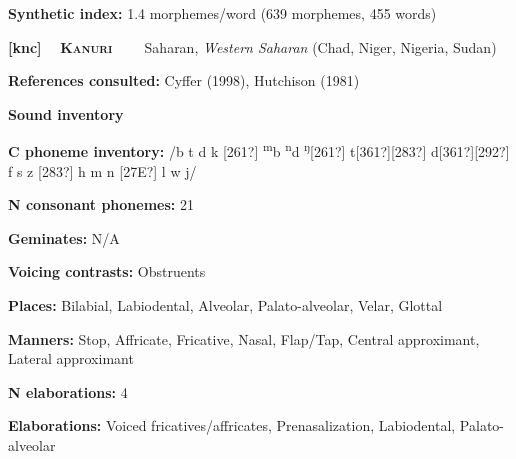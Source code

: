 \begin{styleBody}
\textbf{Synthetic index: }1.4 morphemes/word (639 morphemes, 455 words)
\end{styleBody}

\clearpage\begin{styleBody}
\textbf{[knc] }\ \ \textbf{\textsc{Kanuri}}\textbf{\ \ \ \ }Saharan, \textit{Western Saharan} (Chad, Niger, Nigeria, Sudan)
\end{styleBody}

\begin{styleBody}
\textbf{References consulted: }Cyffer (1998), Hutchison (1981)
\end{styleBody}

\begin{styleBody}
\textbf{Sound inventory}
\end{styleBody}

\begin{styleBody}
\textbf{C phoneme inventory:} /b t d k [261?] \textsuperscript{m}b \textsuperscript{n}d \textsuperscript{ŋ}[261?] t[361?][283?] d[361?][292?] f s z [283?] h m n [27E?] l w j/
\end{styleBody}

\begin{styleBody}
\textbf{N consonant phonemes:} 21
\end{styleBody}

\begin{styleBody}
\textbf{Geminates:} N/A
\end{styleBody}

\begin{styleBody}
\textbf{Voicing contrasts:} Obstruents
\end{styleBody}

\begin{styleBody}
\textbf{Places:} Bilabial, Labiodental, Alveolar, Palato-alveolar, Velar, Glottal
\end{styleBody}

\begin{styleBody}
\textbf{Manners:} Stop, Affricate, Fricative, Nasal, Flap/Tap, Central approximant, Lateral approximant
\end{styleBody}

\begin{styleBody}
\textbf{N elaborations:} 4
\end{styleBody}

\begin{styleBody}
\textbf{Elaborations:} Voiced fricatives/affricates, Prenasalization, Labiodental, Palato-alveolar
\end{styleBody}

